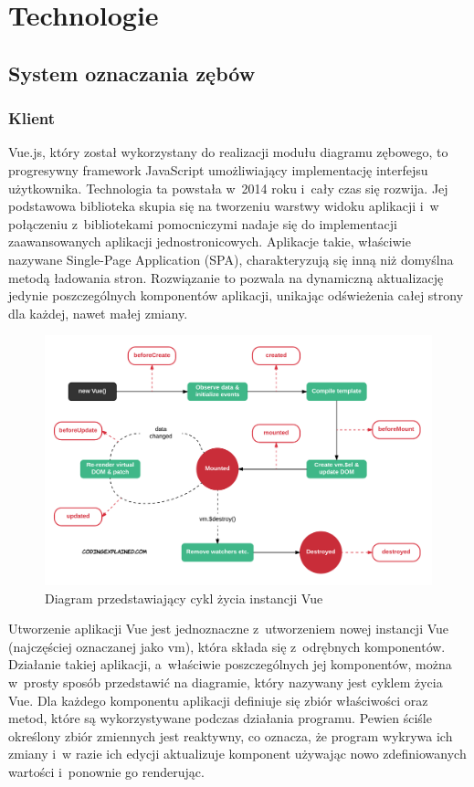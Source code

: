 \chapter{Technologie}

\section{System oznaczania zębów}
\subsection{Klient}

Vue.js, który został wykorzystany do realizacji modułu diagramu zębowego, to progresywny framework JavaScript umożliwiający implementację interfejsu użytkownika. Technologia ta powstała w~2014 roku i~cały czas się rozwija. Jej podstawowa biblioteka skupia się na tworzeniu warstwy widoku aplikacji i~w połączeniu z~bibliotekami pomocniczymi nadaje się do implementacji zaawansowanych aplikacji jednostronicowych. Aplikacje takie, właściwie nazywane Single-Page Application (SPA), charakteryzują się inną niż domyślna metodą ładowania stron. Rozwiązanie to pozwala na dynamiczną aktualizację jedynie poszczególnych komponentów aplikacji, unikając odświeżenia całej strony dla każdej, nawet małej zmiany.

\begin{figure}[ht!]
\centering\includegraphics[width=\textwidth]{figures/Vue-instance-lifecycle-Page-1.png}
\caption{Diagram przedstawiający cykl życia instancji Vue\cite{vueLifeCycle}}
\label{fig:vuepopularity}
\end{figure}

Utworzenie aplikacji Vue jest jednoznaczne z~utworzeniem nowej instancji Vue (najczęściej oznaczanej jako vm), która składa się z~odrębnych komponentów. Działanie takiej aplikacji, a~właściwie poszczególnych jej komponentów, można w~prosty sposób przedstawić na diagramie, który nazywany jest cyklem życia Vue. Dla każdego komponentu aplikacji definiuje się zbiór właściwości oraz metod, które są wykorzystywane podczas działania programu. Pewien ściśle określony zbiór zmiennych jest reaktywny, co oznacza, że program wykrywa ich zmiany i~w razie ich edycji aktualizuje komponent używając nowo zdefiniowanych wartości i~ponownie go renderując.\cite{vuejs}

